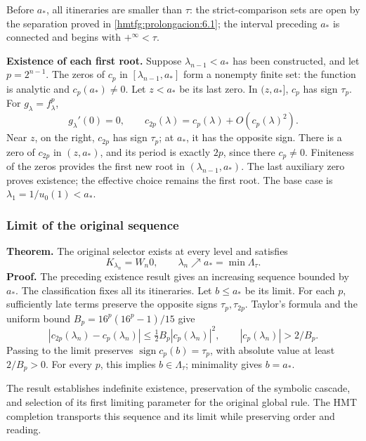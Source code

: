 Before \(a_*\), all itineraries are smaller than \(\tau\): the strict-comparison sets are open by the separation proved in \ref{hmtfg:prolongacion:6.1}; the interval preceding \(a_*\) is connected and begins with \(+^\infty<\tau\).

\textbf{Existence of each first root.} Suppose \(\lambda_{n-1}<a_*\) has been constructed, and let \(p=2^{n-1}\). The zeros of \(c_p\) in \([\lambda_{n-1},a_*]\) form a nonempty finite set: the function is analytic and \(c_p(a_*)\ne0\). Let \(z<a_*\) be its last zero. In \((z,a_*]\), \(c_p\) has sign \(\tau_p\). For \(g_\lambda=f_\lambda^p\),
\[
g_\lambda'(0)=0,\qquad
c_{2p}(\lambda)=c_p(\lambda)+O(c_p(\lambda)^2).
\]
Near \(z\), on the right, \(c_{2p}\) has sign \(\tau_p\); at \(a_*\), it has the opposite sign. There is a zero of \(c_{2p}\) in \((z,a_*)\), and its period is exactly \(2p\), since there \(c_p\ne0\). Finiteness of the zeros provides the first new root in \((\lambda_{n-1},a_*)\). The last auxiliary zero proves existence; the effective choice remains the first root. The base case is \(\lambda_1=1/u_0(1)<a_*\).

\subsubsection{Limit of the original sequence}
\label{hmtfg:escalado:15.2}

\textbf{Theorem.} The original selector exists at every level and satisfies
\begin{equation}
\boxed{K_{\lambda_n}=W_n0,\qquad
\lambda_n\nearrow a_*=\min\Lambda_\tau.}
\label{hmtfg:escalado:eq:50}
\end{equation}
\textbf{Proof.} The preceding existence result gives an increasing sequence bounded by \(a_*\). The classification fixes all its itineraries. Let \(b\le a_*\) be its limit. For each \(p\), sufficiently late terms preserve the opposite signs \(\tau_p,\tau_{2p}\). Taylor’s formula and the uniform bound \(B_p=16^p(16^p-1)/15\) give
\[
|c_{2p}(\lambda_n)-c_p(\lambda_n)|
\le\tfrac12 B_p|c_p(\lambda_n)|^2,\qquad
|c_p(\lambda_n)|>2/B_p.
\]
Passing to the limit preserves \(\operatorname{sign}c_p(b)=\tau_p\), with absolute value at least \(2/B_p>0\). For every \(p\), this implies \(b\in\Lambda_\tau\); minimality gives \(b=a_*\).

The result establishes indefinite existence, preservation of the symbolic cascade, and selection of its first limiting parameter for the original global rule. The HMT completion transports this sequence and its limit while preserving order and reading.


